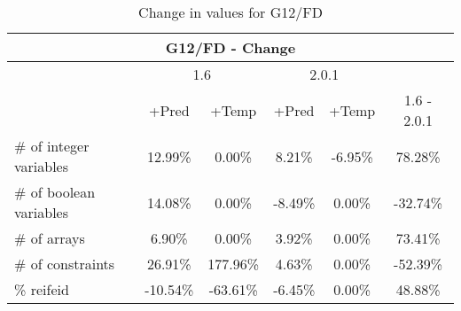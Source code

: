 \documentclass{standalone}
\begin{document}
\begin{table}[H]
\footnotesize
\centering
\begin{tabular}{lc|c|c|c|c}
\multicolumn{6}{c}{G12/FD - Change} \\ 
\hline\hline  & \multicolumn{2}{c|}{1.6} &\multicolumn{2}{c|}{2.0.1} &\\ 
\hline  & +Pred & +Temp & +Pred & +Temp & 1.6 - 2.0.1\\
\# of integer variables & 12.99\% & 0.00\% & 8.21\% & -6.95\% & 78.28\% \\ 
\# of boolean variables & 14.08\% & 0.00\% & -8.49\% & 0.00\% & -32.74\% \\
\# of arrays            & 6.90\% & 0.00\% & 3.92\% & 0.00\% & 73.41\% \\
\# of constraints       & 26.91\% & 177.96\% & 4.63\% & 0.00\% & -52.39\% \\ 
\% reifeid               & -10.54\% & -63.61\% & -6.45\% & 0.00\% & 48.88\%\\ 
\end{tabular}\caption{Change in values for G12/FD}
\end{table}
\end{document}
